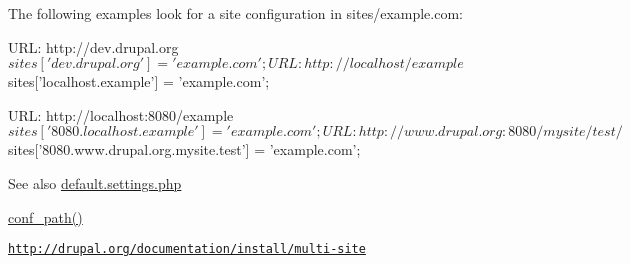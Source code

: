 The following examples look for a site configuration in sites/example.com: 
\begin{DoxyCode}
 URL: http://dev.drupal.org
 $sites['dev.drupal.org'] = 'example.com';

 URL: http://localhost/example
 $sites['localhost.example'] = 'example.com';

 URL: http://localhost:8080/example
 $sites['8080.localhost.example'] = 'example.com';

 URL: http://www.drupal.org:8080/mysite/test/
 $sites['8080.www.drupal.org.mysite.test'] = 'example.com';
\end{DoxyCode}


\begin{DoxySeeAlso}{See also}
\hyperlink{default_8settings_8php}{default.settings.php} 

\hyperlink{bootstrap_8inc_acef612ef19c49f6259531f0bee5c26cc}{conf\_\-path()} 

\href{http://drupal.org/documentation/install/multi-site}{\tt http://drupal.org/documentation/install/multi-\/site} 
\end{DoxySeeAlso}
